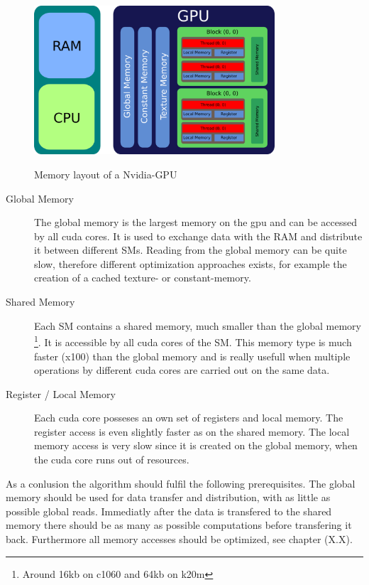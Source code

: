 \begin{figure}[!tbp]
  \centering
  \includegraphics[width=0.8\textwidth]{gfx/cuda/gpu.png}\label{fig:gpu_arch}
  \caption{Memory layout of a Nvidia-GPU}
\end{figure}

\begin{description}
    \item[Global Memory] The global memory is the largest memory on the gpu and can be accessed by all cuda cores.
                         It is  used to exchange data with the RAM and distribute it between different SMs.
                         Reading from the global memory can be quite slow, therefore different optimization approaches exists,
                         for example the creation of a cached texture- or constant-memory.

    \item[Shared Memory] Each SM contains a shared memory, much smaller than the global memory \footnote{Around 16kb on c1060 and 64kb on k20m}. It is accessible
                         by all cuda cores of the SM.
                         This memory type is much faster (x100) than the global memory and is really usefull when multiple operations
                         by different cuda cores are carried out on the same data.

    \item[Register / Local Memory] Each cuda core posseses an own set of registers and local memory.
                                   The register access is even slightly faster as on the shared memory. The local memory access is very slow since
                                   it is created on the global memory, when the cuda core runs out of resources.
\end{description}

As a conlusion the algorithm should fulfil the following prerequisites.
The global memory should be used for data transfer and distribution, with as little as possible global reads.
Immediatly after the data is transfered to the shared memory there should be as many as possible computations before transfering
it back. Furthermore all memory accesses should be optimized, see chapter (X.X).

